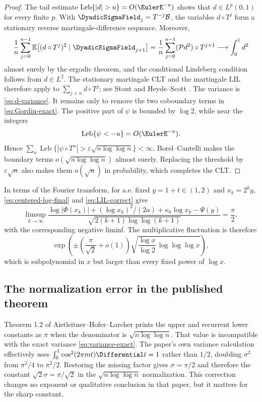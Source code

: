 \documentclass[11pt,oneside]{article}
\theoremstyle{definition}
\theoremstyle{remark}
\begin{document}
\begin{proof}
The tail estimate $\operatorname{Leb}\{|d|>u\}=O(\EulerE^{-u})$ shows that
$d\in L^p(0,1)$ for every finite $p$.  With
$\DyadicSigmaField_j=T^{-j}\mathcal B$, the variables $d\circ T^j$ form a stationary reverse
martingale-difference sequence.  Moreover,
\[
 \frac1n\sum_{j=0}^{n-1}
 \mathbb E\!\left[(d\circ T^j)^2\mid\DyadicSigmaField_{j+1}\right]
 =\frac1n\sum_{j=0}^{n-1}(\mathcal P d^2)\circ T^{j+1}
 \longrightarrow\int_0^1d^2
\]
almost surely by the ergodic theorem, and the conditional Lindeberg condition follows from
$d\in L^2$.  The stationary martingale CLT and the martingale LIL therefore apply to
$\sum_{j<n}d\circ T^j$; see Stout \cite{stout1970} and Heyde--Scott
\cite{heyde-scott1973}.  The variance is \eqref{eq:d-variance}.  It remains only to remove
the two coboundary terms in \eqref{eq:Gordin-exact}.  The positive part of $\psi$ is bounded
by $\log2$, while near the integers
\[
 \operatorname{Leb}\{\psi<-u\}=O(\EulerE^{-u}).
\]
Hence
$\sum_n\operatorname{Leb}\{|\psi\circ T^n|>\varepsilon\sqrt{n\log\log n}\}<\infty$.
Borel--Cantelli makes the boundary terms $o(\sqrt{n\log\log n})$ almost surely.  Replacing
the threshold by $\varepsilon\sqrt n$ also makes them $o(\sqrt n)$ in probability, which
completes the CLT.
\end{proof}

In terms of the Fourier transform, for a.e. fixed $y=1+t\in(1,2)$ and
$x_k=2^ky$, \eqref{eq:centered-log-final} and \eqref{eq:LIL-correct} give
\begin{equation}
 \limsup_{k\to\infty}
 \frac{\log|\Phi(x_k)|+(\log x_k)^2/(2a)+\kappa_0\log x_k-\Psi(y)}
 {\sqrt{2(k+1)\log\log(k+1)}}=\frac\pi2,
 \label{eq:LIL-Phi}
\end{equation}
with the corresponding negative liminf.  The multiplicative fluctuation is therefore
\[
 \exp\!\left(\pm\left(\frac\pi{\sqrt2}+o(1)\right)
 \sqrt{\frac{\log x}{\log2}\,\log\log\log x}\right),
\]
which is subpolynomial in $x$ but larger than every fixed power of $\log x$.

\subsection{The normalization error in the published theorem}
\label{subsec:published-error}

Theorem 1.2 of Aistleitner--Hofer--Larcher \cite{ahl2017} prints the upper and recurrent
lower constants as $\pi$ when the denominator is $\sqrt{n\log\log n}$.  That value is
incompatible with the exact variance \eqref{eq:variance-exact}.  The paper's own variance
calculation effectively uses
$\int_0^1\cos^2(2\pi mt)\Differential t=1$ rather than $1/2$, doubling $\sigma^2$ from
$\pi^2/4$ to $\pi^2/2$.  Restoring the missing factor gives
$\sigma=\pi/2$ and therefore the constant $\sqrt2\sigma=\pi/\sqrt2$ in the
$\sqrt{n\log\log n}$ normalization.  This correction changes no exponent or qualitative
conclusion in that paper, but it matters for the sharp constant.
\end{document}

